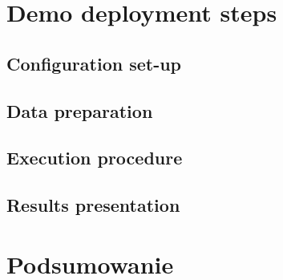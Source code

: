 \documentclass[onecolumn,12pt]{article}
\begin{document}
\section{Demo deployment steps}

\subsection{Configuration set-up}
\subsection{Data preparation}
\subsection{Execution procedure}
\subsection{Results presentation}

\section{Podsumowanie}


\end{document}
